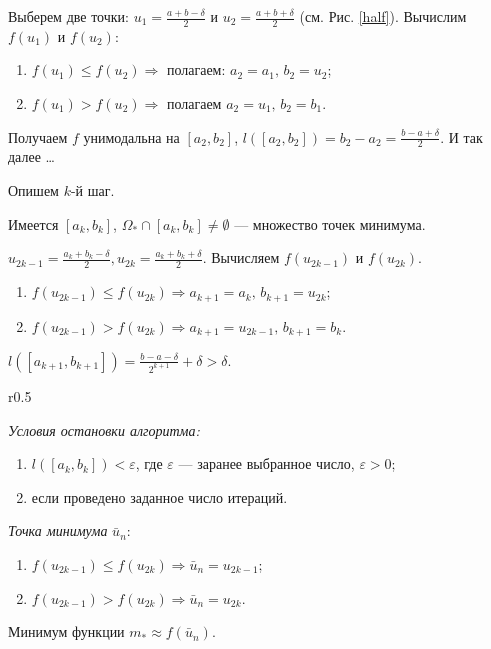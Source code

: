 Выберем две точки: $u_1 = \frac{a + b - \delta}{2}$ и $u_2 = \frac{a + b + \delta}{2}$ (см. Рис. \ref{half}).  Вычислим $f(u_1)$ и $f(u_2)$: 
\begin{enumerate}[label={\arabic*)}]
	\item $f(u_1) \leqslant f(u_2) \Rightarrow$ полагаем: $a_2 = a_1, \, b_2 = u_2$;
	\item $f(u_1 ) > f(u_2) \Rightarrow$ полагаем $a_2 = u_1, \, b_2 = b_1$.
\end{enumerate}

Получаем $f$ унимодальна на $[a_2, b_2]$, $l([a_2, b_2]) = b_2 - a_2 = \frac{b - a + \delta}{2}$. И так далее \dots
\newline

Опишем $k$-й шаг.

Имеется $[a_k, b_k]$, $\Omega_{\ast} \cap [a_k, b_k] \not = \emptyset$ --- множество точек минимума.

$u_{2 k - 1} = \frac{a_k + b_k - \delta}{2}, u_{2 k} = \frac{a_k + b_k + \delta}{2}$. Вычисляем $f(u_{2 k - 1})$ и $f(u_{2 k})$.
\begin{enumerate}[label={\arabic*)}]
	\item  $f(u_{2 k - 1}) \leqslant f(u_{2 k}) \Rightarrow a_{k + 1} = a_k, \, b_{k + 1} = u_{2 k}$;
	\item $f(u_{2 k - 1}) > f(u_{2 k}) \Rightarrow a_{k + 1} = u_{2 k - 1}, \, b_{k + 1} = b_k$.  
\end{enumerate}

$l([a_{k + 1}, b_{k + 1}]) = \frac{b - a - \delta}{2^{k + 1}} + \delta > \delta$.
\newline

\begin{wrapfigure}[10]{r}{0.5\linewidth}
	\centering
	
	\caption{Иллюстрация первого шага.}
	\label{half}
\end{wrapfigure}

\textit{Условия остановки алгоритма:}
\begin{enumerate}
	\item $l([a_k, b_k]) < \varepsilon$, где $\varepsilon$ --- заранее выбранное число, $\varepsilon > 0$; 
	
	\item если проведено заданное число итераций.
\end{enumerate}

\textit{Точка минимума} $\bar{u}_n$:
\begin{enumerate}[label={(\alph*)}]
	\item $f(u_{2k - 1}) \leqslant f(u_{2 k}) \Rightarrow \bar{u}_n = u_{2 k - 1}$;
	
	\item $f(u_{2 k - 1}) > f(u_{2k}) \Rightarrow \bar{u}_n = u_{2 k}$.
\end{enumerate}

Минимум функции $m_{\ast} \approx f(\bar{u}_n)$.
\newline